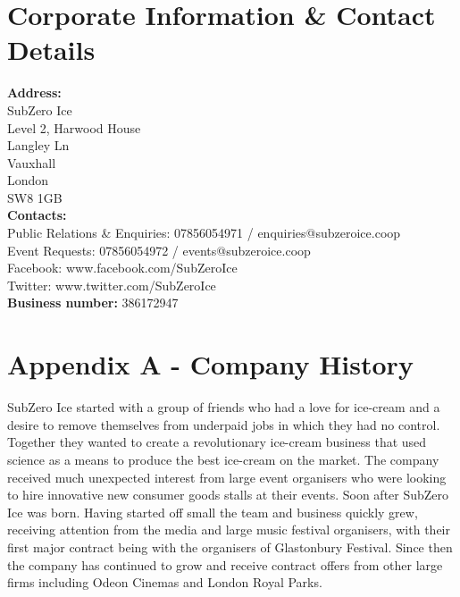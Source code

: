 \documentclass{article}
\begin{document}
\section{Corporate Information \& Contact Details}

{\bf Address:} \\

SubZero Ice \\
Level 2, Harwood House \\
Langley Ln \\
Vauxhall \\
London \\
SW8 1GB \\ 

{\bf Contacts:} \\

Public Relations \& Enquiries: 07856054971 / enquiries@subzeroice.coop \\

Event Requests: 07856054972 / events@subzeroice.coop \\

Facebook: www.facebook.com/SubZeroIce \\

Twitter: www.twitter.com/SubZeroIce \\

{\bf Business number:} 386172947

\pagebreak

\section{Appendix A - Company History}

SubZero Ice started with a group of friends who had a love for ice-cream and a desire to remove themselves from underpaid jobs in which they had no control. Together they wanted to create a revolutionary ice-cream business that used science as a means to produce the best ice-cream on the market. The company received much unexpected interest from large event organisers who were looking to hire innovative new consumer goods stalls at their events. Soon after SubZero Ice was born. Having started off small the team and business quickly grew, receiving attention from the media and large music festival organisers, with their first major contract being with the organisers of Glastonbury Festival. Since then the company has continued to grow and receive contract offers from other large firms including Odeon Cinemas and London Royal Parks.
\end{document}
